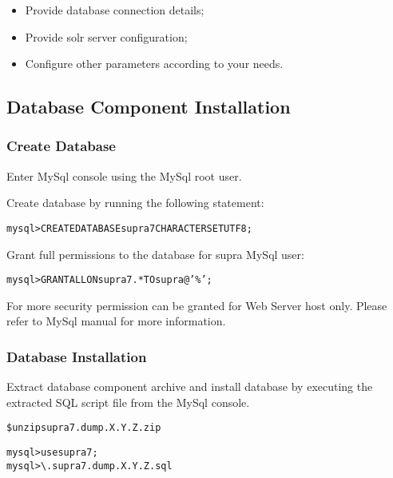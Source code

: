 \documentclass[12pt]{article}
\newcommand{\vigProjectNameShort}{supra7}
\newcommand{\vigPackageName}{supra7}
\begin{document}
\begin{itemize}
	\item Provide database connection details;
	\item Provide \textsf{solr} server configuration;
	\item Configure other parameters according to your needs.
\end{itemize}

\subsection{Database Component Installation}

\subsubsection{Create Database}

Enter MySql console using the MySql root user.

Create database by running the following statement:

\begin{alltt}
mysql> CREATE DATABASE \vigProjectNameShort CHARACTER SET UTF8;
\end{alltt}

Grant full permissions to the database for \textsf{supra} MySql user:

\begin{alltt}
mysql> GRANT ALL ON \vigProjectNameShort.* TO supra@'\%';
\end{alltt}

For more security permission can be granted for Web Server host only. Please refer to MySql manual for more information.

\subsubsection{Database Installation}
Extract database component archive and install database by executing the extracted SQL script file from the MySql console.

\begin{alltt}
\$ unzip {\vigPackageName}.dump.X.Y.Z.zip
\end{alltt}

\begin{alltt}
mysql> use \vigProjectNameShort;
mysql> \textbackslash. {\vigPackageName}.dump.X.Y.Z.sql
\end{alltt}
\end{document}
